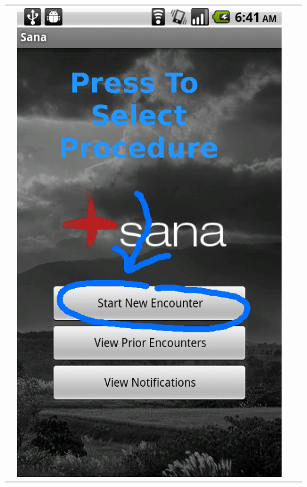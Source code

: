 \documentclass[a4paper,10pt]{article}
\begin{document}
\begin{flushleft}
\begin{tabular}{ c c c c }
&\includegraphics[scale=0.15,keepaspectratio=true]{sana_splash_new_encounter.png}

\end{tabular}
\end{flushleft}
\end{document}
